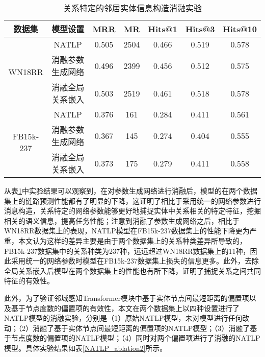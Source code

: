 \begin{table}[htbp]
  \begin{center}
      \caption{关系特定的邻居实体信息构造消融实验}
      \setlength{\tabcolsep}{8pt}
      \renewcommand\arraystretch{1.5}
      \begin{tabular}{*{7}{c}}
          \toprule
          数据集 & 模型设置 & MRR&MR&Hits@1&Hits@3&	Hits@10\\
          \midrule
          \multirow{3}{*}{WN18RR}&NATLP&0.505&2504&0.466&0.519&0.578\\
          &消融参数生成网络&0.496&2399&0.456&0.512&0.575\\
          &消融全局关系嵌入&0.503&2519&0.461&0.518&0.578\\
          \cmidrule{1-7}
          \multirow{3}{*}{FB15k-237}&NATLP&0.376&161&0.284&0.411&0.561\\
          &消融参数生成网络&0.367&145&0.274&0.404&0.555\\
          &消融全局关系嵌入&0.373&175&0.279&0.411&0.558\\
          \bottomrule
      \end{tabular}
      \label{NATLP_ablation1}
  \end{center}
\end{table}

从表\ref{NATLP_ablation1}中实验结果可以观察到，在对参数生成网络进行消融后，模型的在两个数据集上的链路预测性能都有了明显的下降，这证明了相比于采用统一的网络参数进行消息构造，关系特定的网络参数能够更好地捕捉实体中关系相关的特定特征，挖掘相关的语义信息，提高任务性能；注意到消融了参数生成网络之后，相比于WN18RR数据集上的表现，NATLP模型在FB15k-237数据集上的性能下降更为严重，本文认为这样的差异主要是由于两个数据集上的关系种类差异所导致的，FB15k-237数据集中的关系种类为237种，远远超过WN18RR数据集上的11种，因此采用统一的网络参数时模型在FB15k-237数据集上损失的信息更多。此外，去除全局关系嵌入后模型在两个数据集上的性能也有所下降，证明了捕捉关系之间共同特征的有效性。

此外，为了验证邻域感知Transformer模块中基于实体节点间最短距离的偏置项以及基于节点度数的偏置项的有效性，本文在两个数据集上以四种设置进行了NATLP模型的消融实验，分别是（1）原始NATLP模型，未对模型进行任何改动；（2）消融了基于实体节点间最短距离的偏置项的NATLP模型；（3）消融了基于节点度数的偏置项的NATLP模型；（4）同时对两个偏置项进行了消融的NATLP模型。具体实验结果如表\ref{NATLP_ablation2}所示。

